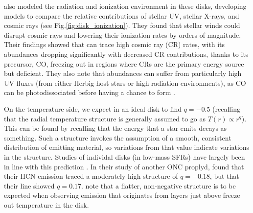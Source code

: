\citet{Cleeves2013,Cleeves2014} also modeled the radiation and ionization environment in these disks, developing models to compare the relative contributions of stellar UV, stellar X-rays, and cosmic rays (see Fig.\ref{fig:disk_ionization}). They found that stellar winds could disrupt cosmic rays and lowering their ionization rates by orders of magnitude. Their findings showed that \hco can trace high cosmic ray (CR) rates, with its abundances dropping significantly with decreased CR contributions, thanks to its precursor, CO, freezing out in regions where CRs are the primary energy source but deficient. They also note that \hco abundances can suffer from particularly high UV fluxes (from either Herbig host stars or high radiation environments), as CO can be photodissociated before having a chance to form \hco. %


On the temperature side, we expect in an ideal disk to find $q=-0.5$ (recalling that the radial temperature structure is generally assumed to go as $T(r) \propto r^{q}$). This can be found by recalling that the energy that a star emits decays as something. Such a structure invokes the assumption of a smooth, consistent distribution of emitting material, so variations from that value indicate variations in the structure. Studies of individal disks (in low-mass SFRs) have largely been in line with this prediction \citep[e.g. ][, whose values range from -0.22 to -0.7]{Dartois2003,Panic2008,Panic2010,Hughes2008,Qi2003,Qi2004,Isella2007,Rosenfeld2012,Flaherty2015,Flaherty2017,Zhang2017,Flaherty2018}. In their study of another ONC proplyd, \citet{Factor2017} found that their HCN emission traced a moderately-high structure of $q=-0.18$, but that their \hco line showed $q=0.17$. \citet{Schwarz2016} note that a flatter, non-negative structure is to be expected when observing emission that originates from layers just above freeze out temperature in the disk.




